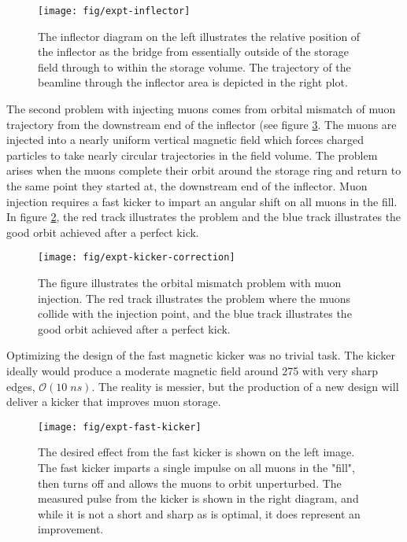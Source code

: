 \begin{figure}
\label{fig:expt-inflector}
\texttt{[image: fig/expt-inflector]}
\caption{The inflector diagram on the left illustrates the relative position of the inflector as the bridge from essentially outside of the storage field through to within the storage volume.  The trajectory of the beamline through the inflector area is depicted in the right plot.}
\end{figure}

The second problem with injecting muons comes from orbital mismatch of muon trajectory from the downstream end of the inflector (see figure \ref{fig:expt-fast-kicker}.  The muons are injected into a nearly uniform vertical magnetic field which forces charged particles to take nearly circular trajectories in the field volume.  The problem arises when the muons complete their orbit around the storage ring and return to the same point they started at, the downstream end of the inflector.  Muon injection requires a fast kicker to impart an angular shift on all muons in the fill. In figure \ref{fig:expt-kicker-correction}, the red track illustrates the problem and the blue track illustrates the good orbit achieved after a perfect kick.

\begin{figure}
\label{fig:expt-kicker-correction}
\centering
\texttt{[image: fig/expt-kicker-correction]}
\caption{The figure illustrates the orbital mismatch problem with muon injection.  The red track illustrates the problem where the muons collide with the injection point, and the blue track illustrates the good orbit achieved after a perfect kick.}
\end{figure}

Optimizing the design of the \gmtwo fast magnetic kicker was no trivial task.  The kicker ideally would produce a moderate magnetic field around \SI{275}{\gauss} with very sharp edges, $\mathcal{O}(10\;ns)$. The reality is messier, but the production of a new design will deliver a kicker that improves muon storage\cite{e989-tdr}.  

\begin{figure}
\label{fig:expt-fast-kicker}
\texttt{[image: fig/expt-fast-kicker]}
\caption{The desired effect from the fast kicker is shown on the left image.  The fast kicker imparts a single impulse on all muons in the "fill", then turns off and allows the muons to orbit unperturbed.  The measured pulse from the kicker is shown in the right diagram, and while it is not a short and sharp as is optimal, it does represent an improvement.}
\end{figure}

